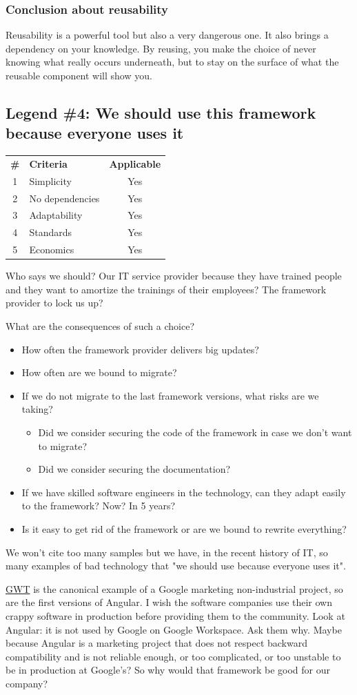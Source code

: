 \documentclass[]{article}
\newcommand{\criterias}[5]
{\begin{center}
\rowcolors{2}{gray!25}{white}
{\small\begin{tabular}{clc}
\rowcolor{gray!50}
\textbf{\#} & \textbf{Criteria} & \textbf{Applicable} \\
1 & Simplicity      & #1 \\
2 & No dependencies & #2 \\
3 & Adaptability    & #3 \\
4 & Standards       & #4 \\
5 & Economics       & #5 \\
\end{tabular}}
\end{center}}
\begin{document}
\subsubsection{Conclusion about reusability}

Reusability is a powerful tool but also a very dangerous one. It also brings a dependency on your knowledge. By reusing, you make the choice of never knowing what really occurs underneath, but to stay on the surface of what the reusable component will show you.

\subsection{Legend \#4: We should use this framework because everyone uses it}

\criterias{Yes}{Yes}{Yes}{Yes}{Yes}

Who says we should? Our IT service provider because they have trained people and they want to amortize the trainings of their employees? The framework provider to lock us up?

What are the consequences of such a choice?

\begin{itemize}
\item How often the framework provider delivers big updates?
\item How often are we bound to migrate?
\item If we do not migrate to the last framework versions, what risks are we taking?
\begin{itemize}
\item Did we consider securing the code of the framework in case we don't want to migrate?
\item Did we consider securing the documentation?
\end{itemize}
\item If we have skilled software engineers in the technology, can they adapt easily to the framework? Now? In 5 years?
\item Is it easy to get rid of the framework or are we bound to rewrite everything?
\end{itemize}

We won't cite too many samples but we have, in the recent history of IT, so many examples of bad technology that "we should use because everyone uses it".

\href{https://en.wikipedia.org/wiki/Google_Web_Toolkit}{GWT} is the canonical example of a Google marketing non-industrial project, so are the first versions of Angular. I wish the software companies use their own crappy software in production before providing them to the community. Look at Angular: it is not used by Google on Google Workspace. Ask them why. Maybe because Angular is a marketing project that does not respect backward compatibility and is not reliable enough, or too complicated, or too unstable to be in production at Google's? So why would that framework be good for our company?
\end{document}
